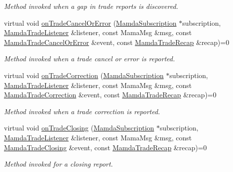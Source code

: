 \begin{CompactItemize}
\begin{CompactList}\small\item\em Method invoked when a gap in trade reports is discovered. \item\end{CompactList}\item 
virtual void \hyperlink{classWombat_1_1MamdaTradeHandler_8be83b1075f878cd7dffc3f0127741e9}{on\-Trade\-Cancel\-Or\-Error} (\hyperlink{classWombat_1_1MamdaSubscription}{Mamda\-Subscription} $\ast$subscription, \hyperlink{classWombat_1_1MamdaTradeListener}{Mamda\-Trade\-Listener} \&listener, const Mama\-Msg \&msg, const \hyperlink{classWombat_1_1MamdaTradeCancelOrError}{Mamda\-Trade\-Cancel\-Or\-Error} \&event, const \hyperlink{classWombat_1_1MamdaTradeRecap}{Mamda\-Trade\-Recap} \&recap)=0
\begin{CompactList}\small\item\em Method invoked when a trade cancel or error is reported. \item\end{CompactList}\item 
virtual void \hyperlink{classWombat_1_1MamdaTradeHandler_369167600f7eadb0a4509246eb912e4a}{on\-Trade\-Correction} (\hyperlink{classWombat_1_1MamdaSubscription}{Mamda\-Subscription} $\ast$subscription, \hyperlink{classWombat_1_1MamdaTradeListener}{Mamda\-Trade\-Listener} \&listener, const Mama\-Msg \&msg, const \hyperlink{classWombat_1_1MamdaTradeCorrection}{Mamda\-Trade\-Correction} \&event, const \hyperlink{classWombat_1_1MamdaTradeRecap}{Mamda\-Trade\-Recap} \&recap)=0
\begin{CompactList}\small\item\em Method invoked when a trade correction is reported. \item\end{CompactList}\item 
virtual void \hyperlink{classWombat_1_1MamdaTradeHandler_1e6ee074b064105c2b018c7465617d8c}{on\-Trade\-Closing} (\hyperlink{classWombat_1_1MamdaSubscription}{Mamda\-Subscription} $\ast$subscription, \hyperlink{classWombat_1_1MamdaTradeListener}{Mamda\-Trade\-Listener} \&listener, const Mama\-Msg \&msg, const \hyperlink{classWombat_1_1MamdaTradeClosing}{Mamda\-Trade\-Closing} \&event, const \hyperlink{classWombat_1_1MamdaTradeRecap}{Mamda\-Trade\-Recap} \&recap)=0
\begin{CompactList}\small\item\em Method invoked for a closing report. \item\end{CompactList}\item 

\end{CompactItemize}
